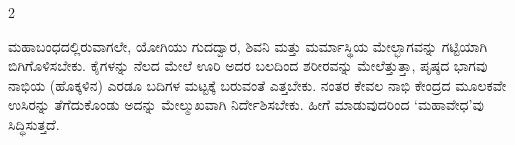 \begin{multicols}{2}
\begin{kan}

ಮಹಾಬಂಧದಲ್ಲಿರುವಾಗಲೇ, ಯೋಗಿಯು ಗುದದ್ವಾರ, ಶಿವನಿ ಮತ್ತು ಮರ್ಮಾಸ್ಥಿಯ ಮೇಲ್ಭಾಗವನ್ನು ಗಟ್ಟಿಯಾಗಿ ಬಿಗಿಗೊಳಿಸಬೇಕು. ಕೈಗಳನ್ನು ನೆಲದ ಮೇಲೆ ಊರಿ ಅದರ ಬಲದಿಂದ ಶರೀರವನ್ನು ಮೇಲೆತ್ತುತ್ತಾ, ಪೃಷ್ಠದ ಭಾಗವು ನಾಭಿಯ (ಹೊಕ್ಕಳಿನ) ಎರಡೂ ಬದಿಗಳ ಮಟ್ಟಕ್ಕೆ ಬರುವಂತೆ ಎತ್ತಬೇಕು. ನಂತರ ಕೇವಲ ನಾಭಿ ಕೇಂದ್ರದ ಮೂಲಕವೇ ಉಸಿರನ್ನು ತೆಗೆದುಕೊಂಡು ಅದನ್ನು ಮೇಲ್ಮುಖವಾಗಿ ನಿರ್ದೇಶಿಸಬೇಕು. ಹೀಗೆ ಮಾಡುವುದರಿಂದ ‘ಮಹಾವೇಧ’ವು ಸಿದ್ಧಿಸುತ್ತದೆ.
\end{kan}
\end{multicols}

\newpage

{}




\newpage

